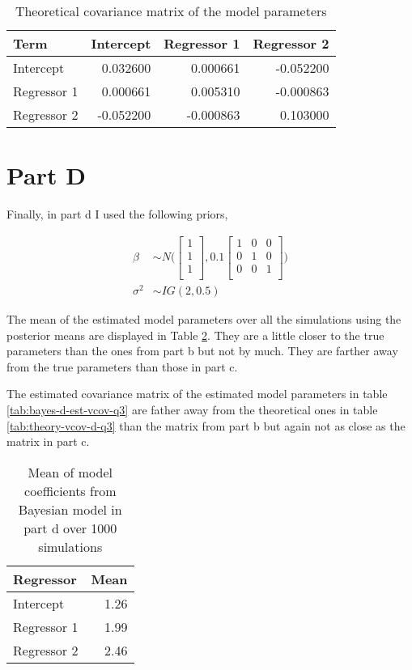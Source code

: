 \documentclass[]{book}
\begin{document}
\begin{table}

\caption{\label{tab:theory-vcov-c-q3}Theoretical covariance matrix of the model parameters}
\centering
\begin{tabular}[t]{lrrr}
\toprule
Term & Intercept & Regressor 1 & Regressor 2\\
\midrule
Intercept & 0.032600 & 0.000661 & -0.052200\\
Regressor 1 & 0.000661 & 0.005310 & -0.000863\\
Regressor 2 & -0.052200 & -0.000863 & 0.103000\\
\bottomrule
\end{tabular}
\end{table}

\hypertarget{part-d-2}{%
\section{Part D}\label{part-d-2}}

Finally, in part d I used the following priors,

\begin{align}
  \beta &\sim N \bigg( 
  \begin{bmatrix}
  1\\
  1\\
  1\\
  \end{bmatrix},
  0.1 \begin{bmatrix}
  1 & 0 & 0\\
  0 & 1 & 0\\
  0 & 0 & 1\\
  \end{bmatrix} \bigg)\\
  \sigma^2 &\sim IG(2, 0.5)
\end{align}

The mean of the estimated model parameters over all the simulations using the posterior means are displayed in Table \ref{tab:bayes-d-mean-coefs-q3}. They are a little closer to the true parameters than the ones from part b but not by much. They are farther away from the true parameters than those in part c.

The estimated covariance matrix of the estimated model parameters in table \ref{tab:bayes-d-est-vcov-q3} are father away from the theoretical ones in table \ref{tab:theory-vcov-d-q3} than the matrix from part b but again not as close as the matrix in part c.

\begin{table}

\caption{\label{tab:bayes-d-mean-coefs-q3}Mean of model coefficients from Bayesian model in part d over 1000 simulations}
\centering
\begin{tabular}[t]{lr}
\toprule
Regressor & Mean\\
\midrule
Intercept & 1.26\\
Regressor 1 & 1.99\\
Regressor 2 & 2.46\\
\bottomrule
\end{tabular}
\end{table}
\end{document}
